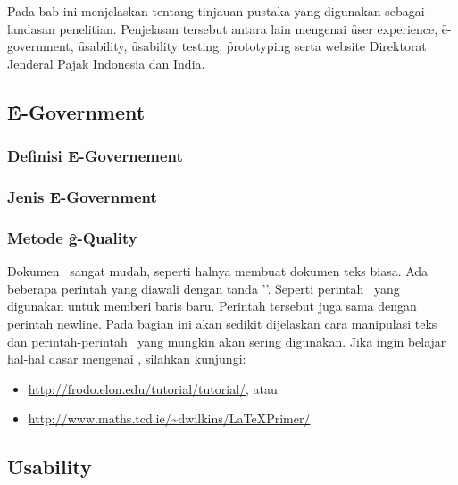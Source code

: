 \chapter{\babDua}
Pada bab ini menjelaskan tentang tinjauan pustaka yang digunakan sebagai landasan penelitian.
Penjelasan tersebut antara lain mengenai \f{user experience}, \f{e-government},
\f{usability}, \f{usability testing}, \f{prototyping} serta website Direktorat Jenderal Pajak Indonesia dan India.
\section{\f{E-Government}}
\subsection{Definisi \f{E-Governement}}
\subsection{Jenis \f{E-Government}}
\subsection{Metode \f{g-Quality}}
Dokumen \latex~sangat mudah, seperti halnya membuat dokumen teks biasa. Ada beberapa perintah yang diawali dengan tanda '\bslash'. Seperti perintah \bslash\bslash~yang digunakan untuk memberi baris baru. 
Perintah tersebut juga sama dengan perintah \bslash newline. Pada bagian ini akan sedikit dijelaskan cara manipulasi teks dan perintah-perintah \latex~yang mungkin akan sering digunakan. 
Jika ingin belajar hal-hal dasar mengenai \latex, silahkan kunjungi: 
\begin{itemize}
	\item \url{http://frodo.elon.edu/tutorial/tutorial/}, atau
	\item \url{http://www.maths.tcd.ie/~dwilkins/LaTeXPrimer/}
\end{itemize}
\section{\f{Usability}}
